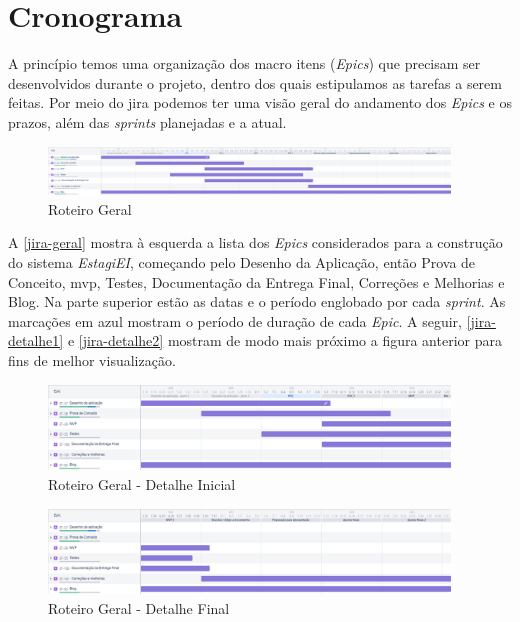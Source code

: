 \section{Cronograma}

A princípio temos uma organização dos macro itens (\textit{Epics}) que precisam ser desenvolvidos durante o projeto, dentro dos quais estipulamos as tarefas a serem feitas. Por meio do \gls{jira} podemos ter uma visão geral do andamento dos \textit{Epics} e os prazos, além das \textit{\glspl{sprint}} planejadas e a atual.

\begin{figure}[H]
	\centering
	\caption{\label{jira-geral}Roteiro Geral}
	\includegraphics[width=0.95\textwidth]{../imagens/cronograma-geral.png}
\end{figure}

A \autoref{jira-geral} mostra à esquerda a lista dos \textit{Epics} considerados para a construção do sistema \emph{EstagiEI}, começando pelo Desenho da Aplicação, então Prova de Conceito, \ac{mvp}, Testes, Documentação da Entrega Final, Correções e Melhorias e Blog. Na parte superior estão as datas e o período englobado por cada \textit{\gls{sprint}}. As marcações em azul mostram o período de duração de cada \textit{Epic}. A seguir, \autoref{jira-detalhe1} e \autoref{jira-detalhe2} mostram de modo mais próximo a figura anterior para fins de melhor visualização.

\begin{figure}[H]
	\centering
	\caption{\label{jira-detalhe1}Roteiro Geral - Detalhe Inicial}
	\includegraphics[width=0.95\textwidth]{../imagens/cronograma-detalhe1.png}
\end{figure}

\begin{figure}[H]
	\centering
	\caption{\label{jira-detalhe2}Roteiro Geral - Detalhe Final}
	\includegraphics[width=0.95\textwidth]{../imagens/cronograma-detalhe2.png}
\end{figure}

